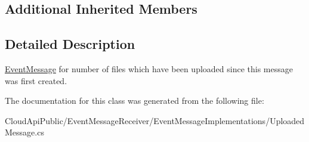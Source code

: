 \subsection*{Additional Inherited Members}


\subsection{Detailed Description}
\hyperlink{class_cloud_api_public_1_1_event_message_receiver_1_1_event_message}{Event\-Message} for number of files which have been uploaded since this message was first created. 



The documentation for this class was generated from the following file\-:\begin{DoxyCompactItemize}
\item 
Cloud\-Api\-Public/\-Event\-Message\-Receiver/\-Event\-Message\-Implementations/Uploaded\-Message.\-cs\end{DoxyCompactItemize}
